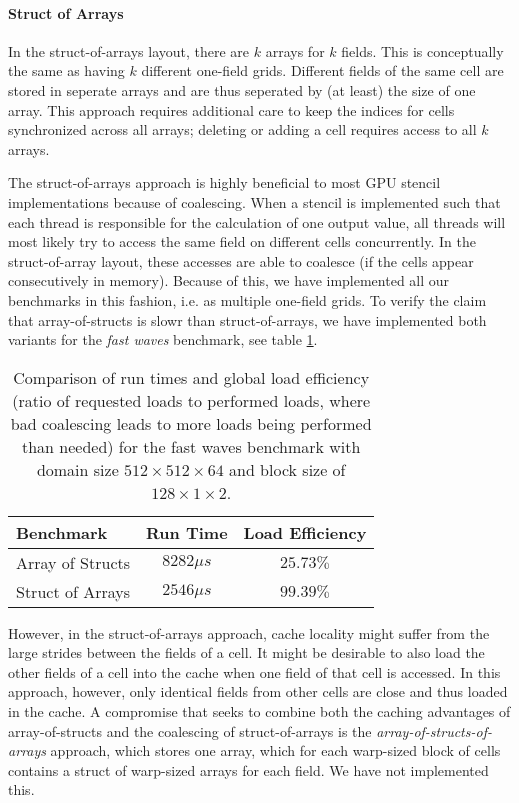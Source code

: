 \paragraph{Struct of Arrays}
In the struct-of-arrays layout, there are $k$ arrays for $k$ fields. This is conceptually the same as having $k$ different one-field grids. Different fields of the same cell are stored in seperate arrays and are thus seperated by (at least) the size of one array. This approach requires additional care to keep the indices for cells synchronized across all arrays; deleting or adding a cell requires access to all $k$ arrays.

The struct-of-arrays approach is highly beneficial to most GPU stencil implementations because of coalescing. When a stencil is implemented such that each thread is responsible for the calculation of one output value, all threads will most likely try to access the same field on different cells concurrently. In the struct-of-array layout, these accesses are able to coalesce (if the cells appear consecutively in memory).  Because of this, we have implemented all our benchmarks in this fashion, i.e. as multiple one-field grids. To verify the claim that array-of-structs is slowr than struct-of-arrays, we have implemented both variants for the \emph{fast waves} benchmark, see table \ref{tab:array-of-structs}.

\begin{table}
	\begin{tabular}{l c c}
		\textbf{Benchmark} & \textbf{Run Time} & \textbf{Load Efficiency} \\
		\hline
		Array of Structs & $8282 \mu s$ & $25.73\%$\\
		Struct of Arrays & $2546 \mu s$ & $99.39\%$
	\end{tabular}
	\caption{\label{tab:array-of-structs} Comparison of run times and global load efficiency (ratio of requested loads to performed loads, where bad coalescing leads to more loads being performed than needed) for the fast waves benchmark with domain size $512\times 512\times 64$ and block size of $128\times 1\times 2$.}
\end{table}

However, in the struct-of-arrays approach, cache locality might suffer from the large strides between the fields of a cell. It might be desirable to also load the other fields of a cell into the cache when one field of that cell is accessed. In this approach, however, only identical fields from other cells are close and thus loaded in the cache. A compromise that seeks to combine both the caching advantages of array-of-structs and the coalescing of struct-of-arrays is the \emph{array-of-structs-of-arrays} approach, which stores one array, which for each warp-sized block of cells contains a struct of warp-sized arrays for each field. We have not implemented this.
